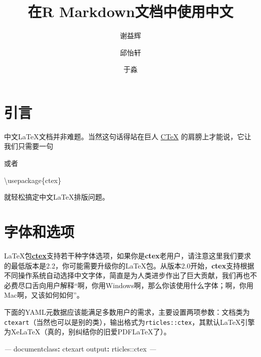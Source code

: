 \documentclass[hyperref,]{ctexart}
\title{在R Markdown文档中使用中文}
\author{谢益辉 \and 邱怡轩 \and 于淼}
\date{}
\newenvironment{Shaded}{\begin{snugshade}}{\end{snugshade}}
\newcommand{\AttributeTok}[1]{\textcolor[rgb]{0.77,0.63,0.00}{#1}}
\newcommand{\BuiltInTok}[1]{#1}
\newcommand{\CommentTok}[1]{\textcolor[rgb]{0.56,0.35,0.01}{\textit{#1}}}
\newcommand{\ExtensionTok}[1]{#1}
\newcommand{\FunctionTok}[1]{\textcolor[rgb]{0.00,0.00,0.00}{#1}}
\newcommand{\KeywordTok}[1]{\textcolor[rgb]{0.13,0.29,0.53}{\textbf{#1}}}
\newcommand{\NormalTok}[1]{#1}
\newcommand{\PreprocessorTok}[1]{\textcolor[rgb]{0.56,0.35,0.01}{\textit{#1}}}
\begin{document}
\maketitle

{
\setcounter{tocdepth}{2}
\tableofcontents
}
\hypertarget{ux5f15ux8a00}{%
\section{引言}\label{ux5f15ux8a00}}

中文LaTeX文档并非难题。当然这句话得站在巨人 \href{http://ctex.org}{CTeX}
的肩膀上才能说，它让我们只需要一句

\begin{Shaded}
\end{Shaded}

或者

\begin{Shaded}
\begin{Highlighting}[]
\BuiltInTok{\textbackslash{}usepackage}\NormalTok{\{}\ExtensionTok{ctex}\NormalTok{\}}
\end{Highlighting}
\end{Shaded}

就轻松搞定中文LaTeX排版问题。

\hypertarget{ux5b57ux4f53ux548cux9009ux9879}{%
\section{字体和选项}\label{ux5b57ux4f53ux548cux9009ux9879}}

LaTeX包\href{http://ctan.org/pkg/ctex}{\textbf{ctex}}支持若干种字体选项，如果你是\textbf{ctex}老用户，请注意这里我们要求的最低版本是2.2，你可能需要升级你的LaTeX包。从版本2.0开始，\textbf{ctex}支持根据不同操作系统自动选择中文字体，简直是为人类进步作出了巨大贡献，我们再也不必费尽口舌向用户解释``啊，你用Windows啊，那么你该使用什么字体；啊，你用Mac啊，又该如何如何''。

下面的YAML元数据应该能满足多数用户的需求，主要设置两项参数：文档类为\texttt{ctexart}（当然也可以是别的类），输出格式为\texttt{rticles::ctex}，其默认LaTeX引擎为XeLaTeX（真的，别纠结你的旧爱PDFLaTeX了）。

\begin{Shaded}
\begin{Highlighting}[]
\PreprocessorTok{---}
\FunctionTok{documentclass}\KeywordTok{:}\AttributeTok{ ctexart}
\FunctionTok{output}\KeywordTok{:}\AttributeTok{ rticles::ctex}
\PreprocessorTok{---}
\end{Highlighting}
\end{Shaded}
\end{document}
